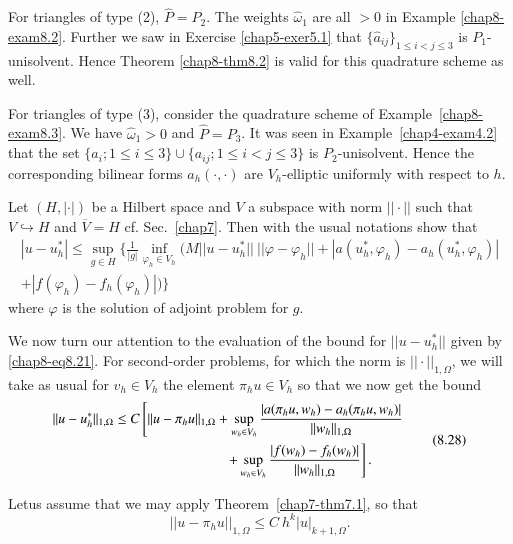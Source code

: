 For triangles of type (2), $\hat{P}=P_{2}$. The weights
$\hat{\omega}_{1}$ are all $>0$ in Example
\ref{chap8-exam8.2}. Further we saw in Exercise \ref{chap5-exer5.1}
that $\{\hat{a}_{ij}\}_{1\leq i<j\leq 3}$ is $P_{1}$-unisolvent. Hence
Theorem \ref{chap8-thm8.2} is valid for this quadrature scheme as
well.

For triangles of type (3), consider the quadrature scheme of
Example~\ref{chap8-exam8.3}. We have $\hat{\omega}_{1}>0$ and
$\hat{P}=P_{3}$. It was seen in Example~\ref{chap4-exam4.2} that the
set $\{a_{i};1\leq i\leq 3\}\cup \{a_{ij};1\leq i<j\leq 3\}$ is
$P_{2}$-unisolvent. Hence the corresponding bilinear forms
$a_{h}(\cdot,\cdot)$ are $V_{h}$-elliptic uniformly with respect to
$h$.

\begin{exercise}\label{chap8-exer8.4}
Let $(H,|\cdot|)$ be a Hilbert space and $V$ a subspace with norm
$||\cdot||$ such that $V\hookrightarrow H$ and $\overline{V}=H$ cf.\@
Sec.~\ref{chap7}. Then with the usual notations show that
\begin{gather*}
|u-u^{*}_{h}|\leq \sup\limits_{g\in
  H}\Big\{\frac{1}{|g|}\inf\limits_{\varphi_{h}\in
  V_{h}}(M||u-u^{*}_{h}||~||\varphi-\varphi_{h}||+|a(u^{*}_{h},\varphi_{h})-a_{h}(u^{*}_{h},\varphi_{h})|\\
+|f(\varphi_{h})-f_{h}(\varphi_{h})|)\Big\}
\end{gather*}
where $\varphi$ is the solution of adjoint problem for $g$.
\end{exercise}

We now turn our attention to the evaluation of the bound for
$||u-u^{*}_{h}||$ given by \eqref{chap8-eq8.21}. For second-order
problems, for which the norm is $||\cdot||_{1,\Omega}$, we will take
as usual for $v_{h}\in V_{h}$ the element $\pi_{h}u\in V_{h}$ so that
we now get the bound
\begin{equation*}
\begin{split}
||u-u^{*}_{h}||_{1,\Omega} &\leq C
\left[||u-\pi_{h}u||_{1,\Omega}+\sup\limits_{w_{h}\in
    V_{h}}\frac{|a(\pi_{h}u,w_{h})-a_{h}(\pi_{h}u,w_{h})|}{||w_{h}||_{1,\Omega}}\right.\\
& \left. \hspace{2.8cm} +\sup\limits_{w_{h}\in V_{h}}\frac{|f(w_{h})-f_{h}(w_{h})|}{||w_{h}||_{1,\Omega}}\right].
\end{split}\tag{8.28}\label{chap8-eq8.28}
\end{equation*}

Let\pageoriginale us assume that we may apply
Theorem~\ref{chap7-thm7.1}, so that
\begin{equation*}
||u-\pi_{h}u||_{1,\Omega}\leq
C\ h^{k}|u|_{k+1,\Omega}.\tag{8.29}\label{chap8-eq8.29} 
\end{equation*}

